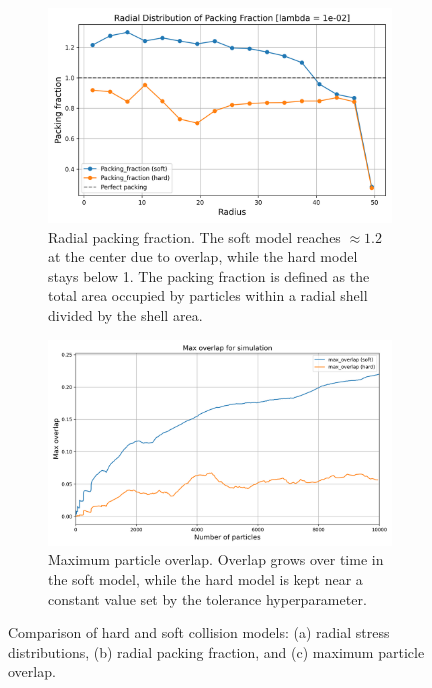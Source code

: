 \documentclass[conference]{IEEEtran}
\begin{document}
\begin{figure}[H]
    \begin{subfigure}[b]{\linewidth}
        \centering
        \includegraphics[width=\linewidth]{figures/comparisons/radial_distribution_packing_fraction.png}
        \caption{Radial packing fraction. The soft model reaches $\approx1.2$ at the center due to overlap, while the hard model stays below 1. The packing fraction is defined as the total area occupied by particles within a radial shell divided by the shell area.}
        \label{fig:radial_distribution_packing_fraction}
    \end{subfigure}

    \vspace{0.5em}

    \begin{subfigure}[b]{\linewidth}
        \centering
        \includegraphics[width=\linewidth]{figures/comparisons/max_overlap_simulation.png}
        \caption{Maximum particle overlap. Overlap grows over time in the soft model, while the hard model is kept near a constant value set by the tolerance hyperparameter.}
        \label{fig:max_overlap_simulation}
    \end{subfigure}

    \caption{Comparison of hard and soft collision models: (a) radial stress distributions, (b) radial packing fraction, and (c) maximum particle overlap.}
    \label{fig:comparison_all}
\end{figure}
\end{document}
